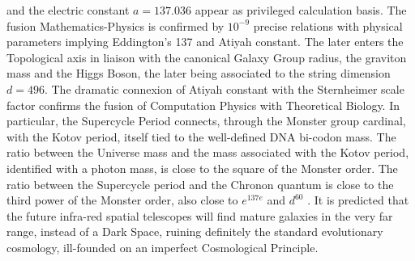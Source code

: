 and the electric constant $a = 137.036$ appear as privileged calculation basis. The fusion
Mathematics-Physics is confirmed by $10^{-9}$ precise relations with physical parameters
implying Eddington's 137 and Atiyah constant. The later enters the Topological axis in
liaison with the canonical Galaxy Group radius, the graviton mass and the Higgs Boson,
the later being associated to the string dimension $d = 496$. The dramatic connexion of
Atiyah constant with the Sternheimer scale factor confirms the fusion of Computation
Physics with Theoretical Biology. In particular, the Supercycle Period connects, through the
Monster group cardinal, with the Kotov period, itself tied to the well-defined DNA bi-codon
mass. The ratio between the Universe mass and the mass associated with the Kotov period,
identified with a photon mass, is close to the square of the Monster order. The ratio between
the Supercycle period and the Chronon quantum is close to the third power of the Monster
order, also close to $ e^{137e}$ and $ d^{60}$ . It is predicted that the future infra-red spatial telescopes
will find mature galaxies in the very far range, instead of a Dark Space, ruining definitely
the standard evolutionary cosmology, ill-founded on an imperfect Cosmological Principle.
